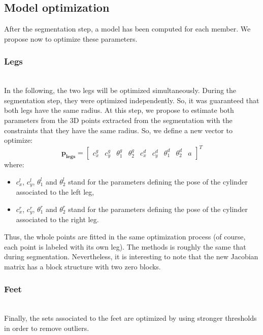 \documentclass[letterpaper, 10 pt, conference]{ieeeconf}
\begin{document}
\subsection{Model optimization}
After the segmentation step, a model has been computed for each member. We propose now to optimize these parameters.

\subsubsection{Legs}~\\
In the following, the two legs will be {optimized simultaneously}. During the segmentation step, they were optimized independently. So, it was guaranteed that both legs have the same radius. At this step, we propose to estimate both parameters from the 3D points extracted from the segmentation with the constraints that they have the same radius. So, we define a new vector to optimize:
\begin{equation}
	\mathbf{p_{legs}} = 
	\begin{bmatrix}
		c_x^g & c_y^g & \theta_1^g & \theta_2^g & c_x^d & c_y^d & \theta_1^d & \theta_2^d & a
	\end{bmatrix}^T
\end{equation}
where:
\begin{itemize}
	\item $c_x^l$, $c_y^l$, $\theta_1^l$ and $\theta_2^l$ stand for the parameters defining the pose of the cylinder associated to the left leg,
	\item $c_x^r$, $c_y^r$, $\theta_1^r$ and $\theta_2^r$ stand for the parameters defining the pose of the cylinder associated to the right leg.
\end{itemize}
Thus, the whole points are fitted in the same optimization process (of course, each point is labeled with its own leg). The methods is roughly the same that during segmentation. Nevertheless, it is interesting to note that the new Jacobian matrix has a block structure with two zero blocks.

\subsubsection{Feet}~\\
Finally, the sets associated to the feet are optimized by using stronger thresholds in order to remove outliers.
\end{document}
